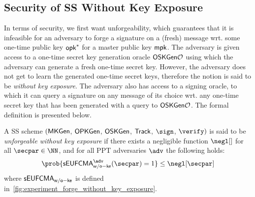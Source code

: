 \subsection{Security of SS Without Key Exposure}

In terms of security, we first want unforgeability, which guarantees that it is infeasible for an adversary to forge a signature on a (fresh) message wrt. some one-time public key $\mathsf{opk}^*$ for a master public key $\mathsf{mpk}$.
The adversary is given access to a one-time secret key generation oracle $\mathsf{OSKGen}\mathcal{O}$ using which the adversary can generate a fresh one-time secret key.
However, the adversary does not get to learn the generated one-time secret keys, therefore the notion is said to be \emph{without key exposure}.
The adversary also has access to a signing oracle, to which it can query a signature on any message of its choice wrt. any one-time secret key that has been generated with a query to $\mathsf{OSKGen}\mathcal{O}$. The formal definition is presented below.

\begin{definition}
A SS scheme $(\mathsf{MKGen}$, $\mathsf{OPKGen}$, $\mathsf{OSKGen}$, $\mathsf{Track}$, $\sign$, $\verify)$ is said to be
\emph{unforgeable without key exposure} if there exists a negligible function $\negl[]$ for all $\secpar \in \NN$, and for all PPT adversaries $\adv$ the following holds:
\[ \prob{\seufcmawoke^\adv (\secpar)=1} \le \negl[\secpar]\]
where $\mathsf{sEUFCMA}_\mathsf{w/o-ke}$ is defined in~\cref{fig:experiment_forge_without_key_exposure}.
\end{definition}

